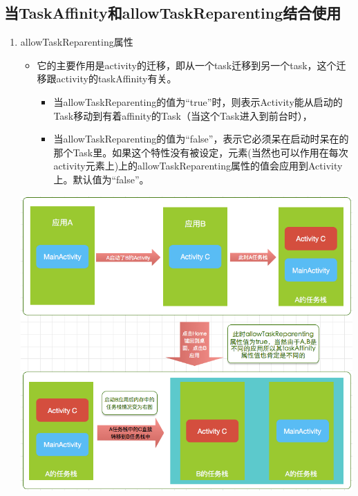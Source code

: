 \documentclass[9pt, b5paaper]{book}
\begin{document}
\subsection{当TaskAffinity和allowTaskReparenting结合使用}
\label{sec-4-9-2}
\begin{enumerate}
\item allowTaskReparenting属性
\label{sec-4-9-2-1}
\begin{itemize}
\item 它的主要作用是activity的迁移，即从一个task迁移到另一个task，这个迁移跟activity的taskAffinity有关。
\begin{itemize}
\item 当allowTaskReparenting的值为“true”时，则表示Activity能从启动的Task移动到有着affinity的Task（当这个Task进入到前台时），
\item 当allowTaskReparenting的值为“false”，表示它必须呆在启动时呆在的那个Task里。如果这个特性没有被设定，元素(当然也可以作用在每次activity元素上)上的allowTaskReparenting属性的值会应用到Activity上。默认值为“false”。
\end{itemize}
\end{itemize}

\includegraphics[width=.9\linewidth]{./pic/reparenting.png}


\end{enumerate}
\end{document}
